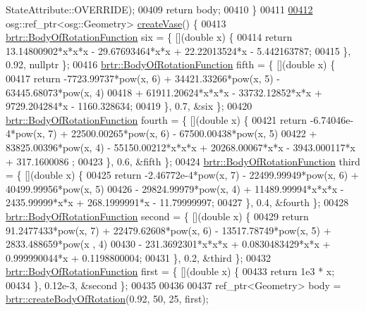 \begin{DoxyCode}
      StateAttribute::OVERRIDE);
00409         \textcolor{keywordflow}{return} body;
00410     \}
00411 
\hypertarget{_util_functions_8cpp_source_l00412}{}\hyperlink{namespacebrtr_ab4f3c063f7a8fa6cc33a8cb52b036d27}{00412}     osg::ref\_ptr<osg::Geometry> \hyperlink{namespacebrtr_ab4f3c063f7a8fa6cc33a8cb52b036d27}{createVase}() \{
00413         \hyperlink{structbrtr_1_1_body_of_rotation_function}{brtr::BodyOfRotationFunction} six = \{ [](\textcolor{keywordtype}{double} x) \{
00414             \textcolor{keywordflow}{return}  13.14800902*x*x*x - 29.67693464*x*x + 22.22013524*x - 5.442163787;
00415         \}, 0.92, \textcolor{keyword}{nullptr} \};
00416         \hyperlink{structbrtr_1_1_body_of_rotation_function}{brtr::BodyOfRotationFunction} fifth = \{ [](\textcolor{keywordtype}{double} x) \{
00417             \textcolor{keywordflow}{return} -7723.99737*pow(x, 6) + 34421.33266*pow(x, 5) - 63445.68073*pow(x, 4)
00418                 + 61911.20624*x*x*x - 33732.12852*x*x + 9729.204284*x - 1160.328634;
00419         \}, 0.7, &six \};
00420         \hyperlink{structbrtr_1_1_body_of_rotation_function}{brtr::BodyOfRotationFunction} fourth = \{ [](\textcolor{keywordtype}{double} x) \{
00421             \textcolor{keywordflow}{return} -6.74046e-4*pow(x, 7) + 22500.00265*pow(x, 6) - 67500.00438*pow(x, 5)
00422                 + 83825.00396*pow(x, 4) - 55150.00212*x*x*x + 20268.00067*x*x - 3943.000117*x + 317.1600086
      ;
00423         \}, 0.6, &fifth \};
00424         \hyperlink{structbrtr_1_1_body_of_rotation_function}{brtr::BodyOfRotationFunction} third = \{ [](\textcolor{keywordtype}{double} x) \{
00425             \textcolor{keywordflow}{return} -2.46772e-4*pow(x, 7) - 22499.99949*pow(x, 6) + 40499.99956*pow(x, 5)
00426                 - 29824.99979*pow(x, 4) + 11489.99994*x*x*x - 2435.99999*x*x + 268.1999991*x - 11.79999997;
00427         \}, 0.4, &fourth \};
00428         \hyperlink{structbrtr_1_1_body_of_rotation_function}{brtr::BodyOfRotationFunction} second = \{ [](\textcolor{keywordtype}{double} x) \{
00429             \textcolor{keywordflow}{return} 91.2477433*pow(x, 7) + 22479.62608*pow(x, 6) - 13517.78749*pow(x, 5) + 2833.488659*pow(x
      , 4)
00430                 - 231.3692301*x*x*x + 0.0830483429*x*x + 0.999990044*x + 0.1198800004;
00431         \}, 0.2, &third \};
00432         \hyperlink{structbrtr_1_1_body_of_rotation_function}{brtr::BodyOfRotationFunction} first = \{ [](\textcolor{keywordtype}{double} x) \{
00433             \textcolor{keywordflow}{return} 1e3 * x;
00434         \}, 0.12e-3, &second \};
00435 
00436 
00437         ref\_ptr<Geometry> body = \hyperlink{namespacebrtr_a83d3e627c9dc247459610aa9fec23d7b}{brtr::createBodyOfRotation}(0.92, 50, 25, first);

\end{DoxyCode}
